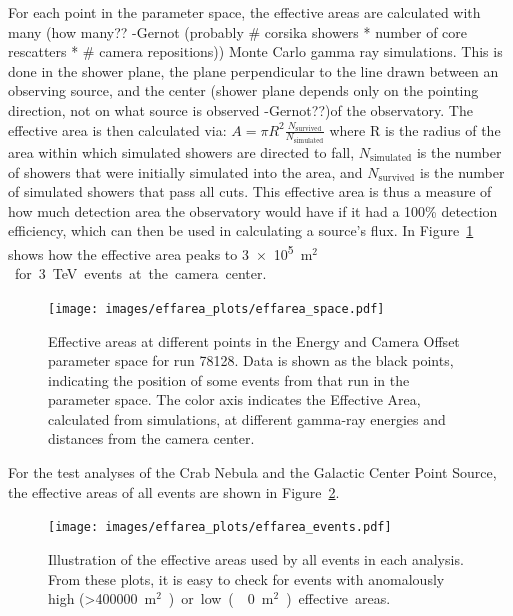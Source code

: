     For each point in the parameter space, the effective areas are calculated with many {\color{red}(how many?? -Gernot (probably # corsika showers * number of core rescatters * # camera repositions))} Monte Carlo gamma ray simulations.
    This is done in the shower plane, {\color{red} the plane perpendicular to the line drawn between an observing source, and the center (shower plane depends only on the pointing direction, not on what source is observed -Gernot??)}of the observatory.
    The effective area is then calculated via:
    $A=\pi R^2 \frac{N_{\text{survived}}}{N_{\text{simulated}}}$
    where R is the radius of the area within which simulated showers are directed to fall, $N_{\text{simulated}}$ is the number of showers that were initially simulated into the area, and $N_{\text{survived}}$ is the number of simulated showers that pass all cuts.
    This effective area is thus a measure of how much detection area the observatory would have if it had a 100\% detection efficiency, which can then be used in calculating a source's flux.
    In Figure~\ref{fig:effarea_paramspace} shows how the effective area peaks to \nicetilde{}\SI{3e5}{m${}^2$} for \SI{3}{\TeV} events at the camera center.

    \begin{figure}[ht]
      \centering
      \texttt{[image: images/effarea\_plots/effarea\_space.pdf]}
      \caption[Effective Area Parameter Space]{
        Effective areas at different points in the Energy and Camera Offset parameter space for run 78128.
        Data is shown as the black points, indicating the position of some events from that run in the parameter space.
        The color axis indicates the Effective Area, calculated from simulations, at different gamma-ray energies and distances from the camera center.
      }
      \label{fig:effarea_paramspace}
    \end{figure}

    For the test analyses of the Crab Nebula and the Galactic Center Point Source, the effective areas of all events are shown in Figure~\ref{fig:effarea_usage}.

    \begin{figure}[ht]
      \centering
      \texttt{[image: images/effarea\_plots/effarea\_events.pdf]}
      \caption[Effective Areas Used]{
      Illustration of the effective areas used by all events in each analysis.
      From these plots, it is easy to check for events with anomalously high (>\SI{400000}{m${}^2$}) or low (\nicetilde\SI{0}{m${}^2$}) effective areas.
      }
      \label{fig:effarea_usage}
    \end{figure}
  

